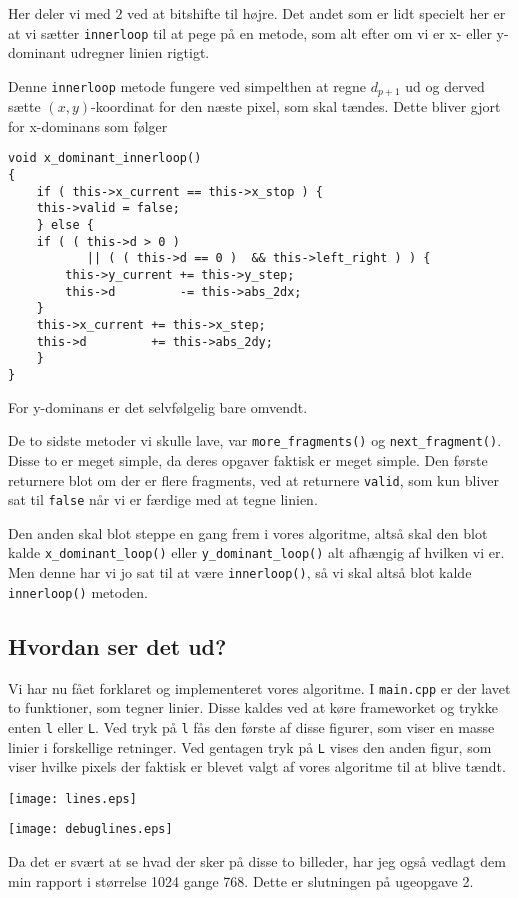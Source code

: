 \documentclass[a4paper, 10pt]{article}
\begin{document}
Her deler vi med $2$ ved at bitshifte til højre.
Det andet som er lidt specielt her er at vi sætter \texttt{innerloop} til at pege på en metode, som alt efter om vi er x- eller y-dominant udregner linien rigtigt.

Denne \texttt{innerloop} metode fungere ved simpelthen at regne $d_{p+1}$ ud og derved sætte $(x,y)$-koordinat for den næste pixel, som skal tændes.
Dette bliver gjort for x-dominans som følger

\lstset{firstnumber=1}
\begin{lstlisting}
void x_dominant_innerloop()
{
    if ( this->x_current == this->x_stop ) {
	this->valid = false;
    } else {
	if ( ( this->d > 0 ) 
           || ( ( this->d == 0 )  && this->left_right ) ) {
	    this->y_current += this->y_step;
	    this->d         -= this->abs_2dx;
	}
	this->x_current += this->x_step;
	this->d         += this->abs_2dy;
    }
}
\end{lstlisting}

For y-dominans er det selvfølgelig bare omvendt.

De to sidste metoder vi skulle lave, var \texttt{more\_fragments()} og \texttt{next\_fragment()}.
Disse to er meget simple, da deres opgaver faktisk er meget simple.
Den første returnere blot om der er flere fragments, ved at returnere \texttt{valid}, som kun bliver sat til \texttt{false} når vi er færdige med at tegne linien.

Den anden skal blot steppe en gang frem i vores algoritme, altså skal den blot kalde \texttt{x\_dominant\_loop()} eller \texttt{y\_dominant\_loop()} alt afhængig af hvilken vi er.
Men denne har vi jo sat til at være \texttt{innerloop()}, så vi skal altså blot kalde \texttt{innerloop()} metoden.

\subsection{Hvordan ser det ud?}
Vi har nu fået forklaret og implementeret vores algoritme.
I \texttt{main.cpp} er der lavet to funktioner, som tegner linier.
Disse kaldes ved at køre frameworket og trykke enten \texttt{l} eller \texttt{L}.
Ved tryk på \texttt{l} fås den første af disse figurer, som viser en masse linier i forskellige retninger.
Ved gentagen tryk på \texttt{L} vises den anden figur, som viser hvilke pixels der faktisk er blevet valgt af vores algoritme til at blive tændt.

\begin{center}
\centering
\texttt{[image: lines.eps]}
\end{center}

\begin{center}
\centering
\texttt{[image: debuglines.eps]}
\end{center}

Da det er svært at se hvad der sker på disse to billeder, har jeg også vedlagt dem min rapport i størrelse 1024 gange 768.
Dette er slutningen på ugeopgave 2.
\end{document}
